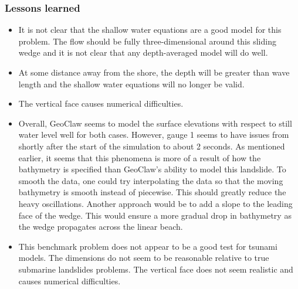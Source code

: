 \subsubsection{Lessons learned}


\begin{itemize}
\item
It is not clear that the shallow water equations are a good model for this
problem.  The flow should be fully three-dimensional around this sliding
wedge and it is not clear that any depth-averaged model will do well.

\item At some distance away from the shore, 
the depth will be greater than wave length and the shallow water equations
will no longer be valid.

\item The vertical face causes numerical difficulties.

\item 
Overall, GeoClaw seems to model the surface elevations with respect to still water
level well for both cases.  However, gauge 1 seems to have issues from shortly
after the start of the simulation to about 2 seconds.  As mentioned earlier, it seems
that this phenomena is more of a result of how the bathymetry is specified than
GeoClaw's ability to model this landslide.  To smooth the data, one could try 
interpolating the data so that the moving bathymetry is smooth instead of
piecewise.  This should greatly reduce the heavy oscillations.  Another approach
would be to add a slope to the leading face of the wedge.  This would ensure a 
more gradual drop in bathymetry as the wedge propagates across the linear
beach.


\item
This benchmark problem does not appear to be a good test for tsunami models.
The dimensions do not seem to be reasonable relative to true submarine
landslides problems.  The vertical face does not seem realistic and causes
numerical difficulties.

\end{itemize} 
